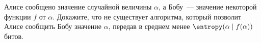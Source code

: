 Алисе сообщено значение случайной величины $\alpha$, а Бобу~--- значение некоторой функции $f$ от
$\alpha$. Докажите, что не существует алгоритма, который позволит Алисе сообщить Бобу значение $\alpha$,
передав в среднем менее $\entropy(\alpha \mid f(\alpha))$ битов.
